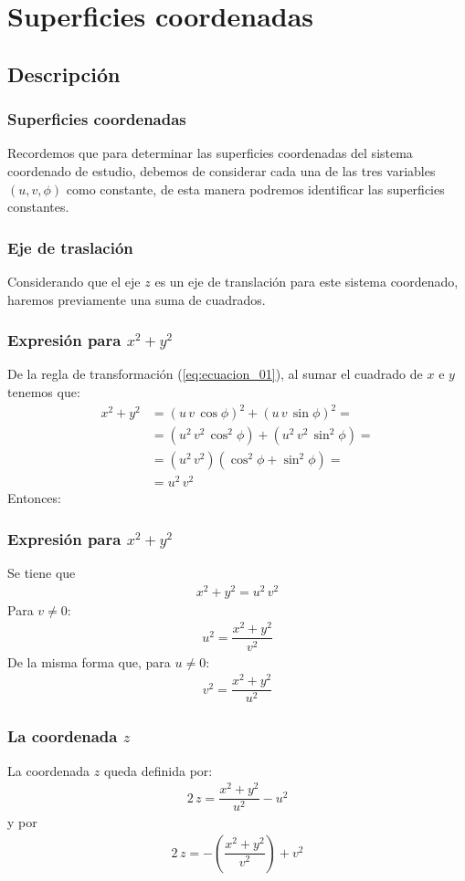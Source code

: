 \section{Superficies coordenadas}
\subsection{Descripción}
\begin{frame}
\frametitle{Superficies coordenadas}
Recordemos que para determinar las superficies coordenadas del sistema coordenado de estudio, debemos de considerar cada una de las tres variables $(u, v, \phi)$ como constante, de esta manera podremos identificar las superficies constantes.
\end{frame}
\begin{frame}
\frametitle{Eje de traslación}
Considerando que el eje $z$ es un eje de translación para este sistema coordenado, haremos previamente una suma de cuadrados.
\end{frame}
\begin{frame}
\frametitle{Expresión para $x^{2}+ y^{2}$}
De la regla de transformación (\ref{eq:ecuacion_01}), al sumar el cuadrado de $x$ e $y$ tenemos que:
\begin{align*}
x^{2} + y^{2} &= (u \, v \, \cos \phi)^{2} + (u \, v \, \sin \phi)^{2} = \\[0.5em]
&= (u^{2} \, v^{2} \, \cos^{2} \phi) + (u^{2} \, v^{2} \, \sin^{2} \phi) = \\[0.5em]
&= (u^{2} \, v^{2}) (\cos^{2} \phi + \sin^{2} \phi) = \\[0.5em]
&= u^{2} \, v^{2}
\end{align*}
Entonces:
\end{frame}
\begin{frame}
\frametitle{Expresión para $x^{2}+ y^{2}$}
Se tiene que
\begin{align*}
x^{2}+ y^{2} = u^{2} \, v^{2}
\end{align*}
\pause
Para $v \neq 0$:
\begin{align*}
u^{2} = \dfrac{x^{2}+ y^{2}}{v^{2}}
\end{align*}
\pause
De la misma forma que, para $u \neq 0$:
\begin{align*}
v^{2} = \dfrac{x^{2}+ y^{2}}{u^{2}}
\end{align*}
\end{frame}
\begin{frame}
\frametitle{La coordenada $z$}
La coordenada $z$ queda definida por:
\begin{align}
2 \, z = \dfrac{x^{2}+ y^{2}}{u^{2}} - u^{2}
\label{eq:ecuacion_02}
\end{align}
y por
\begin{align}
2 \, z = - \left( \dfrac{x^{2}+ y^{2}}{v^{2}} \right) + v^{2}
\label{eq:ecuacion_03}
\end{align}
\end{frame}
